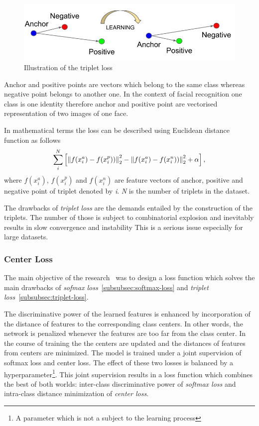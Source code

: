 \begin{figure}[H]
    \centering
    \includegraphics[width=\columnwidth]{images/face-recognition/tripletloss.jpeg}
    \caption{Illustration of the triplet loss~\cite{TripletLoss}}
    \label{fig:tripletloss}
\end{figure}

Anchor and positive points are vectors which belong to the same class whereas negative point belongs to another one.
In the context of facial recognition one class is one identity therefore anchor and positive point are vectorised
representation of two images of one face.

In mathematical terms the loss can be described using Euclidean distance function as follows
\begin{equation}
    \sum_{i}^{N} \left[ \left\lVert f(x_{i}^{a}) - f(x_{i}^{p}))\right\rVert^2_2
    - \left\lVert f(x_{i}^{a}) - f(x_{i}^{n}))\right\rVert^2_2 + \alpha \right],
\end{equation}
where $f(x_{i}^{a})$, $f(x_{i}^{p})$ and $f(x_{i}^{n})$ are feature vectors of anchor, positive and
negative point of triplet denoted by \textit{i}.
\textit{N} is the number of triplets in the dataset.

The drawbacks of \textit{triplet loss} are the demands entailed by the construction of the triplets.
The number of those is subject to combinatorial explosion and inevitably results in slow convergence and instability
This is a serious issue especially for large datasets.

\subsubsection{Center Loss}\label{subsubsec:center-loss}
The main objective of the research~\cite{CenterLoss} was to design a loss function which solves the main drawbacks of
\textit{sofmax loss}~\ref{subsubsec:softmax-loss} and \textit{triplet loss}~\ref{subsubsec:triplet-loss}.

The discriminative power of the learned features is enhanced by incorporation of the distance of features to the
corresponding class centers.
In other words, the network is penalized whenever the features are too far from the class center.
In the course of training the the centers are updated and the distances of features from centers are minimized.
The model is trained under a joint supervision of softmax loss and center loss.
The effect of these two losses is balanced by a hyperparameter\footnote{A parameter which is not a subject to the
learning process}.
This joint supervision results in a loss function which combines the best of both worlds:
inter-class discriminative power of \textit{softmax loss} and intra-class distance minimization of \textit{center loss}.

